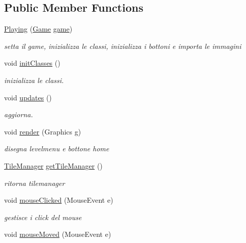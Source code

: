 \subsection*{Public Member Functions}
\begin{DoxyCompactItemize}
\item 
\hyperlink{classscenes_1_1_playing_af94feaa0eefab45fb50a75c76679c2c7}{Playing} (\hyperlink{classprogetto_1_1_game}{Game} \hyperlink{classscenes_1_1_game_scene_ac6a5ed6191fcf3a5bf0445921feb4f48}{game})
\begin{DoxyCompactList}\small\item\em setta il game, inizializza le classi, inizializza i bottoni e importa le immagini \end{DoxyCompactList}\item 
void \hyperlink{classscenes_1_1_playing_afe125d345675ffefe8da7e96d39773f3}{init\+Classes} ()
\begin{DoxyCompactList}\small\item\em inizializza le classi. \end{DoxyCompactList}\item 
void \hyperlink{classscenes_1_1_playing_a79c40c8c02ea1005b787c02252e57172}{updates} ()
\begin{DoxyCompactList}\small\item\em aggiorna. \end{DoxyCompactList}\item 
void \hyperlink{classscenes_1_1_playing_a203b6ad9d5e4d54dd1152986eec4dedc}{render} (Graphics g)
\begin{DoxyCompactList}\small\item\em disegna levelmenu e bottone home \end{DoxyCompactList}\item 
\hyperlink{classmanagers_1_1_tile_manager}{Tile\+Manager} \hyperlink{classscenes_1_1_playing_ad519f2a339c804d206a38ecd2c33f667}{get\+Tile\+Manager} ()
\begin{DoxyCompactList}\small\item\em ritorna tilemanager \end{DoxyCompactList}\item 
void \hyperlink{classscenes_1_1_playing_a45d56bd84238e8b56589dfc732e2b2cf}{mouse\+Clicked} (Mouse\+Event e)
\begin{DoxyCompactList}\small\item\em gestisce i click del mouse \end{DoxyCompactList}\item 
void \hyperlink{classscenes_1_1_playing_a2ca251710b65639ec80bc141edde60aa}{mouse\+Moved} (Mouse\+Event e)

\end{DoxyCompactItemize}
